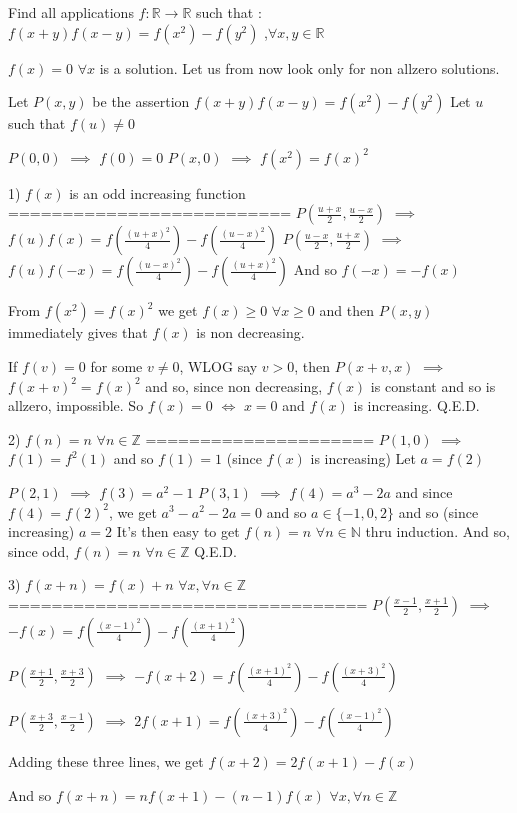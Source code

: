 \begin{solution}
	\begin{tcolorbox}Find all applications $f:\mathbb{R}\rightarrow \mathbb{R}$ such that : $f(x+y)f(x-y)=f(x^2)-f(y^2)$ ,$\forall{x,y\in{\mathbb{R}}}$\end{tcolorbox}
$f(x)=0$ $\forall x$ is a solution. Let us from now look only for non allzero solutions.

Let $P(x,y)$ be the assertion $f(x+y)f(x-y)=f(x^2)-f(y^2)$
Let $u$ such that $f(u)\ne 0$

$P(0,0)$ $\implies$ $f(0)=0$
$P(x,0)$ $\implies$ $f(x^2)=f(x)^2$

1) $f(x)$ is an odd increasing function
==========================
$P(\frac{u+x}2,\frac{u-x}2)$ $\implies$ $f(u)f(x)=f(\frac{(u+x)^2}4)-f(\frac{(u-x)^2}4)$
$P(\frac{u-x}2,\frac{u+x}2)$ $\implies$ $f(u)f(-x)=f(\frac{(u-x)^2}4)-f(\frac{(u+x)^2}4)$
And so $f(-x)=-f(x)$

From $f(x^2)=f(x)^2$ we get $f(x)\ge 0$ $\forall x\ge 0$ and then $P(x,y)$ immediately gives that $f(x)$ is non decreasing.

If $f(v)=0$ for some $v\ne 0$, WLOG say $v>0$, then $P(x+v,x)$ $\implies$ $f(x+v)^2=f(x)^2$ and so, since non decreasing, $f(x)$ is constant and so is allzero, impossible.
So $f(x)=0$ $\iff$ $x=0$ and $f(x)$ is increasing.
Q.E.D.

2) $f(n)=n$ $\forall n\in\mathbb Z$
=====================
$P(1,0)$ $\implies$ $f(1)=f^2(1)$ and so $f(1)=1$ (since $f(x)$ is increasing)
Let $a=f(2)$

$P(2,1)$ $\implies$ $f(3)=a^2-1$
$P(3,1)$ $\implies$ $f(4)=a^3-2a$ and since $f(4)=f(2)^2$, we get $a^3-a^2-2a=0$ and so $a\in\{-1,0,2\}$ and so (since increasing) $a=2$
It's then easy to get $f(n)=n$ $\forall n\in\mathbb N$ thru induction.
And so, since odd, $f(n)=n$ $\forall n\in\mathbb Z$
Q.E.D.

3) $f(x+n)=f(x)+n$ $\forall x,\forall n\in\mathbb Z$
=================================
$P(\frac{x-1}2,\frac{x+1}2)$ $\implies$ $-f(x)=f(\frac{(x-1)^2}4)-f(\frac{(x+1)^2}4)$

$P(\frac{x+1}2,\frac{x+3}2)$ $\implies$ $-f(x+2)=f(\frac{(x+1)^2}4)-f(\frac{(x+3)^2}4)$

$P(\frac{x+3}2,\frac{x-1}2)$ $\implies$ $2f(x+1)=f(\frac{(x+3)^2}4)-f(\frac{(x-1)^2}4)$

Adding these three lines, we get $f(x+2)=2f(x+1)-f(x)$

And so $f(x+n)=nf(x+1)-(n-1)f(x)$ $\forall x,\forall n\in\mathbb Z$


\end{solution}
